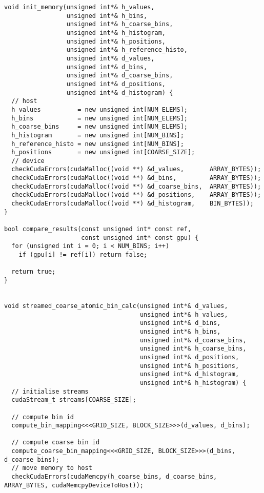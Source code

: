 \begin{lstlisting}[captionpos=t, xleftmargin=0.0pt, xrightmargin=0.0pt, caption={Coarse Histogram implementation}, label={lst:coarse histogram impl}]
void init_memory(unsigned int*& h_values,
                 unsigned int*& h_bins,
                 unsigned int*& h_coarse_bins,
                 unsigned int*& h_histogram,
                 unsigned int*& h_positions,
                 unsigned int*& h_reference_histo,
                 unsigned int*& d_values,
                 unsigned int*& d_bins,
                 unsigned int*& d_coarse_bins,
                 unsigned int*& d_positions,
                 unsigned int*& d_histogram) {
  // host
  h_values          = new unsigned int[NUM_ELEMS];
  h_bins            = new unsigned int[NUM_ELEMS];
  h_coarse_bins     = new unsigned int[NUM_ELEMS];
  h_histogram       = new unsigned int[NUM_BINS];
  h_reference_histo = new unsigned int[NUM_BINS];
  h_positions       = new unsigned int[COARSE_SIZE];
  // device
  checkCudaErrors(cudaMalloc((void **) &d_values,       ARRAY_BYTES));
  checkCudaErrors(cudaMalloc((void **) &d_bins,         ARRAY_BYTES));
  checkCudaErrors(cudaMalloc((void **) &d_coarse_bins,  ARRAY_BYTES));
  checkCudaErrors(cudaMalloc((void **) &d_positions,    ARRAY_BYTES));
  checkCudaErrors(cudaMalloc((void **) &d_histogram,    BIN_BYTES));
}

bool compare_results(const unsigned int* const ref,
                     const unsigned int* const gpu) {
  for (unsigned int i = 0; i < NUM_BINS; i++)
    if (gpu[i] != ref[i]) return false;

  return true;
}


void streamed_coarse_atomic_bin_calc(unsigned int*& d_values,
                                     unsigned int*& h_values,
                                     unsigned int*& d_bins,
                                     unsigned int*& h_bins,
                                     unsigned int*& d_coarse_bins,
                                     unsigned int*& h_coarse_bins,
                                     unsigned int*& d_positions,
                                     unsigned int*& h_positions,
                                     unsigned int*& d_histogram,
                                     unsigned int*& h_histogram) {
  // initialise streams
  cudaStream_t streams[COARSE_SIZE];

  // compute bin id
  compute_bin_mapping<<<GRID_SIZE, BLOCK_SIZE>>>(d_values, d_bins);

  // compute coarse bin id
  compute_coarse_bin_mapping<<<GRID_SIZE, BLOCK_SIZE>>>(d_bins, d_coarse_bins);
  // move memory to host
  checkCudaErrors(cudaMemcpy(h_coarse_bins, d_coarse_bins, ARRAY_BYTES, cudaMemcpyDeviceToHost));


\end{lstlisting}
